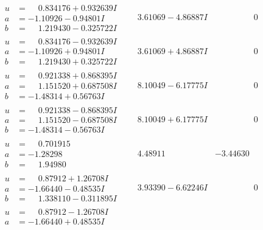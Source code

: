 \documentclass[1p]{elsarticle_modified}
\theoremstyle{definition}
\begin{document}
$$\begin{array}{c|c|c}
\begin{aligned}
u &= \phantom{-}0.834176 + 0.932639 I \\
a &= -1.10926 - 0.94801 I \\
b &= \phantom{-}1.219430 - 0.325722 I\end{aligned}
 & \phantom{-}3.61069 - 4.86887 I & \phantom{-0.000000 } 0 \\ \hline\begin{aligned}
u &= \phantom{-}0.834176 - 0.932639 I \\
a &= -1.10926 + 0.94801 I \\
b &= \phantom{-}1.219430 + 0.325722 I\end{aligned}
 & \phantom{-}3.61069 + 4.86887 I & \phantom{-0.000000 } 0 \\ \hline\begin{aligned}
u &= \phantom{-}0.921338 + 0.868395 I \\
a &= \phantom{-}1.151520 + 0.687508 I \\
b &= -1.48314 + 0.56763 I\end{aligned}
 & \phantom{-}8.10049 - 6.17775 I & \phantom{-0.000000 } 0 \\ \hline\begin{aligned}
u &= \phantom{-}0.921338 - 0.868395 I \\
a &= \phantom{-}1.151520 - 0.687508 I \\
b &= -1.48314 - 0.56763 I\end{aligned}
 & \phantom{-}8.10049 + 6.17775 I & \phantom{-0.000000 } 0 \\ \hline\begin{aligned}
u &= \phantom{-}0.701915\phantom{ +0.000000I} \\
a &= -1.28298\phantom{ +0.000000I} \\
b &= \phantom{-}1.94980\phantom{ +0.000000I}\end{aligned}
 & \phantom{-}4.48911\phantom{ +0.000000I} & -3.44630\phantom{ +0.000000I} \\ \hline\begin{aligned}
u &= \phantom{-}0.87912 + 1.26708 I \\
a &= -1.66440 - 0.48535 I \\
b &= \phantom{-}1.338110 - 0.311895 I\end{aligned}
 & \phantom{-}3.93390 - 6.62246 I & \phantom{-0.000000 } 0 \\ \hline\begin{aligned}
u &= \phantom{-}0.87912 - 1.26708 I \\
a &= -1.66440 + 0.48535 I \\

\end{aligned}
\end{array}$$
\end{document}
